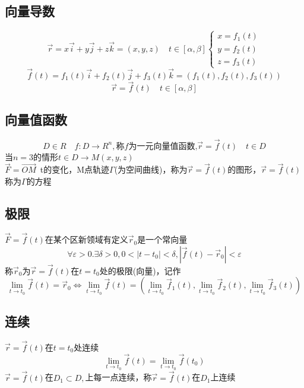 \begin{center}\section{向量导数}\label{chapter_vector_derivative}\end{center}
$$\overrightarrow{r}=x\overrightarrow{i}+y\overrightarrow{j}+z\overrightarrow{k}=(x,y,z)\quad t\in[\alpha,\beta]\begin{cases}
	x=f_1(t)\\
	y=f_2(t)\\
	z=f_3(t)
\end{cases}$$
$$\overrightarrow{f}(t)=f_1(t)\overrightarrow{i}+f_2(t)\overrightarrow{j}+f_3(t)\overrightarrow{k}=(f_1(t),f_2(t),f_3(t))$$
$$\overrightarrow{r}=\overrightarrow{f}(t)\quad t\in[\alpha,\beta]$$
\subsection{向量值函数}
$$D\in R\quad f:D\rightarrow R^n,\mbox{称}f\mbox{为一元向量值函数,}\overrightarrow{r}=\overrightarrow{f}(t)\quad t\in D $$
当$n=3$的情形\qquad$t\in D\rightarrow M(x,y,z)$\\
$\overrightarrow{F}=\overrightarrow{OM}$\ t的变化，M点轨迹$\Gamma$(为空间曲线)，称为$\overrightarrow{r}=\overrightarrow{f}(t)$的图形，$\overrightarrow{r}=\overrightarrow{f}(t)$称为$\Gamma$的方程
\subsection{极限}
$\overrightarrow{F}=\overrightarrow{f}(t)$在某个区新领域有定义$\overrightarrow{r}_0$是一个常向量\\
$$\forall\varepsilon>0.\exists\delta>0,0<|t-t_0|<\delta,|\overrightarrow{f}(t)-\overrightarrow{r}_0|<\varepsilon$$
称$\overrightarrow{r}_0$为$\overrightarrow{r}=\overrightarrow{f}(t)$在$t=t_0$处的极限(向量)，记作
$$\lim\limits_{t\to t_0}\overrightarrow{f}(t)=\overrightarrow{r}_0\Leftrightarrow \lim\limits_{t\to t_0}\overrightarrow{f}(t)=\left(\lim\limits_{t\to t_0}\overrightarrow{f}_1(t),\lim\limits_{t\to t_0}\overrightarrow{f}_2(t),\lim\limits_{t\to t_0}\overrightarrow{f}_3(t)\right)$$
\subsection{连续}
$\overrightarrow{r}=\overrightarrow{f}(t)$在$t=t_0$处连续
$$\lim\limits_{t\to t_0}\overrightarrow{f}(t)=\lim\limits_{t\to t_0}\overrightarrow{f}(t_0)$$
$\overrightarrow{r}=\overrightarrow{f}(t)$在$D_1\subset D,$上每一点连续，称$\overrightarrow{r}=\overrightarrow{f}(t)$在$D_1$上连续
